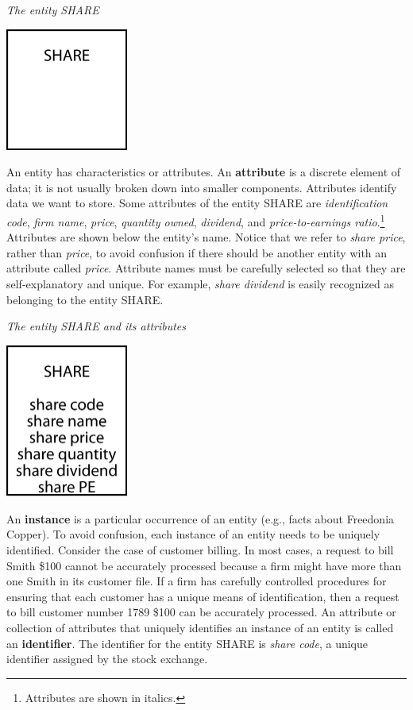 \documentclass[
]{article}
\begin{document}
\emph{The entity SHARE}

\includegraphics[width=1.58333in,height=\textheight]{Figures/Chapter 3/share.png}

An entity has characteristics or attributes. An \textbf{attribute} is a discrete element of data; it is not usually broken down into smaller components. Attributes identify data we want to store. Some attributes of the entity SHARE are \emph{identification code}, \emph{firm name}, \emph{price}, \emph{quantity owned}, \emph{dividend}, and \emph{price-to-earnings ratio}.\footnote{Attributes are shown in italics.} Attributes are shown below the entity's name. Notice that we refer to \emph{share price}, rather than \emph{price}, to avoid confusion if there should be another entity with an attribute called \emph{price}. Attribute names must be carefully selected so that they are self-explanatory and unique. For example, \emph{share dividend} is easily recognized as belonging to the entity SHARE.

\emph{The entity SHARE and its attributes}

\includegraphics[width=1.58333in,height=\textheight]{Figures/Chapter 3/share with attributes.png}

An \textbf{instance} is a particular occurrence of an entity (e.g., facts about Freedonia Copper). To avoid confusion, each instance of an entity needs to be uniquely identified. Consider the case of customer billing. In most cases, a request to bill Smith \$100 cannot be accurately processed because a firm might have more than one Smith in its customer file. If a firm has carefully controlled procedures for ensuring that each customer has a unique means of identification, then a request to bill customer number 1789 \$100 can be accurately processed. An attribute or collection of attributes that uniquely identifies an instance of an entity is called an \textbf{identifier}. The identifier for the entity SHARE is \emph{share code}, a unique identifier assigned by the stock exchange.
\end{document}
